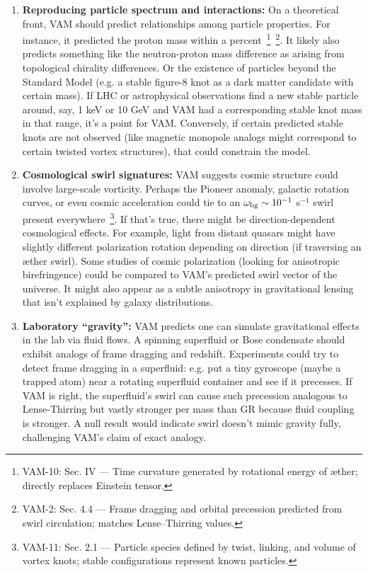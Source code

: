 \documentclass[a4paper,12pt]{article}
\begin{document}
\begin{enumerate}
        \item \textbf{Reproducing particle spectrum and interactions:}
        On a theoretical front, VAM should predict relationships among particle properties. For instance, it predicted the proton mass within a percent~\footnote{VAM-10: Sec. IV — Time curvature generated by rotational energy of æther; directly replaces Einstein tensor.}~\footnote{VAM-2: Sec. 4.4 — Frame dragging and orbital precession predicted from swirl circulation; matches Lense–Thirring values.}. It likely also predicts something like the neutron-proton mass difference as arising from topological chirality differences. Or the existence of particles beyond the Standard Model (e.g. a stable figure-8 knot as a dark matter candidate with certain mass). If LHC or astrophysical observations find a new stable particle around, say, 1 keV or 10 GeV and VAM had a corresponding stable knot mass in that range, it’s a point for VAM. Conversely, if certain predicted stable knots are not observed (like magnetic monopole analogs might correspond to certain twisted vortex structures), that could constrain the model.

        \item \textbf{Cosmological swirl signatures:}
        VAM suggests cosmic structure could involve large-scale vorticity. Perhaps the Pioneer anomaly, galactic rotation curves, or even cosmic acceleration could tie to an $\omega_{\rm bg} \sim 10^{-1}$ s$^{-1}$ swirl present everywhere~\footnote{VAM-11: Sec. 2.1 — Particle species defined by twist, linking, and volume of vortex knots; stable configurations represent known particles.}. If that’s true, there might be direction-dependent cosmological effects. For example, light from distant quasars might have slightly different polarization rotation depending on direction (if traversing an æther swirl). Some studies of cosmic polarization (looking for anisotropic birefringence) could be compared to VAM’s predicted swirl vector of the universe. It might also appear as a subtle anisotropy in gravitational lensing that isn’t explained by galaxy distributions.

        \item \textbf{Laboratory “gravity”:}
        VAM predicts one can simulate gravitational effects in the lab via fluid flows. A spinning superfluid or Bose condensate should exhibit analogs of frame dragging and redshift. Experiments could try to detect frame dragging in a superfluid: e.g. put a tiny gyroscope (maybe a trapped atom) near a rotating superfluid container and see if it precesses. If VAM is right, the superfluid’s swirl can cause such precession analogous to Lense-Thirring but vastly stronger per mass than GR because fluid coupling is stronger. A null result would indicate swirl doesn’t mimic gravity fully, challenging VAM’s claim of exact analogy.

    \end{enumerate}
\end{document}
